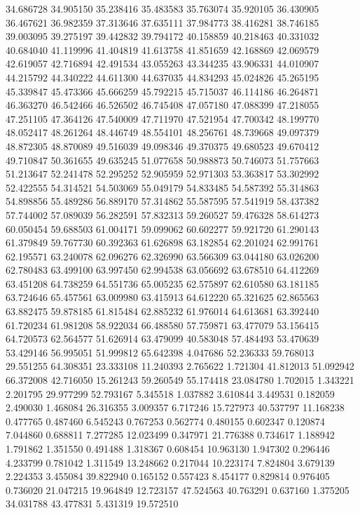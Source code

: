 34.686728
34.905150
35.238416
35.483583
35.763074
35.920105
36.430905
36.467621
36.982359
37.313646
37.635111
37.984773
38.416281
38.746185
39.003095
39.275197
39.442832
39.794172
40.158859
40.218463
40.331032
40.684040
41.119996
41.404819
41.613758
41.851659
42.168869
42.069579
42.619057
42.716894
42.491534
43.055263
43.344235
43.906331
44.010907
44.215792
44.340222
44.611300
44.637035
44.834293
45.024826
45.265195
45.339847
45.473366
45.666259
45.792215
45.715037
46.114186
46.264871
46.363270
46.542466
46.526502
46.745408
47.057180
47.088399
47.218055
47.251105
47.364126
47.540009
47.711970
47.521954
47.700342
48.199770
48.052417
48.261264
48.446749
48.554101
48.256761
48.739668
49.097379
48.872305
48.870089
49.516039
49.098346
49.370375
49.680523
49.670412
49.710847
50.361655
49.635245
51.077658
50.988873
50.746073
51.757663
51.213647
52.241478
52.295252
52.905959
52.971303
53.363817
53.302992
52.422555
54.314521
54.503069
55.049179
54.833485
54.587392
55.314863
54.898856
55.489286
56.889170
57.314862
55.587595
57.541919
58.437382
57.744002
57.089039
56.282591
57.832313
59.260527
59.476328
58.614273
60.050454
59.688503
61.004171
59.099062
60.602277
59.921720
61.290143
61.379849
59.767730
60.392363
61.626898
63.182854
62.201024
62.991761
62.195571
63.240078
62.096276
62.326990
63.566309
63.044180
63.026200
62.780483
63.499100
63.997450
62.994538
63.056692
63.678510
64.412269
63.451208
64.738259
64.551736
65.005235
62.575897
62.610580
63.181185
63.724646
65.457561
63.009980
63.415913
64.612220
65.321625
62.865563
63.882475
59.878185
61.815484
62.885232
61.976014
64.613681
63.392440
61.720234
61.981208
58.922034
66.488580
57.759871
63.477079
53.156415
64.720573
62.564577
51.626914
63.479099
40.583048
57.484493
53.470639
53.429146
56.995051
51.999812
65.642398
4.047686
52.236333
59.768013
29.551255
64.308351
23.333108
11.240393
2.765622
1.721304
41.812013
51.092942
66.372008
42.716050
15.261243
59.260549
55.174418
23.084780
1.702015
1.343221
2.201795
29.977299
52.793167
5.345518
1.037882
3.610844
3.449531
0.182059
2.490030
1.468084
26.316355
3.009357
6.717246
15.727973
40.537797
11.168238
0.477765
0.487460
6.545243
0.767253
0.562774
0.480155
0.602347
0.120874
7.044860
0.688811
7.277285
12.023499
0.347971
21.776388
0.734617
1.188942
1.791862
1.351550
0.491488
1.318367
0.608454
10.963130
1.947302
0.296446
4.233799
0.781042
1.311549
13.248662
0.217044
10.223174
7.824804
3.679139
2.224353
3.455084
39.822940
0.165152
0.557423
8.454177
0.829814
0.976405
0.736020
21.047215
19.964849
12.723157
47.524563
40.763291
0.637160
1.375205
34.031788
43.477831
5.431319
19.572510
